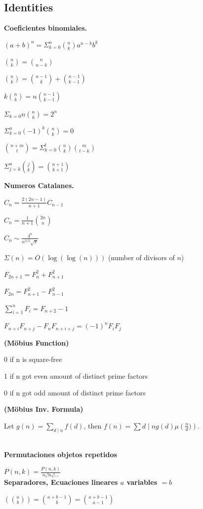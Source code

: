 \subsection{Identities}
{

\textbf{Coeficientes binomiales.}

$(a+b)^{n} = \Sigma_{k = 0}^{n} \binom{n}{k}a^{n-k}b^{k}$

$\binom{n}{k} = \binom{n}{n-k}$

$\binom{n}{k} = \binom{n-1}{k} + \binom{n-1}{k-1}$

$k\binom{n}{k} = n\binom{n-1}{k-1}$

$\Sigma_{k = 0}{n}\binom{n}{k} = 2^{n}$

$\Sigma_{k = 0}^{n} (-1)^{k}\binom{n}{k} = 0$

$\binom{n+m}{t} = \Sigma_{k = 0}^{t}\binom{n}{k}\binom{m}{t-k}$

$\Sigma_{j = k}^{n} \binom{j}{k} = \binom{n+1}{k+1}$

\textbf{Numeros Catalanes.}

$C_n = \frac{2(2n-1)}{n+1} C_{n-1}$

$C_n = \frac{1}{n+1} \binom{2n}{n}$

$C_n \sim \frac{4^n}{n^{3/2}\sqrt{\pi}}$

$\Sigma(n) = O(\log(\log(n)))$ (number of divisors of $n$)

$F_{2n+1} = F_{n}^2 + F_{n+1}^2$

$F_{2n} = F_{n+1}^2 - F_{n-1}^2$

$\sum_{i=1}^n F_i = F_{n+2}-1$

$F_{n+i}F_{n+j} - F_nF_{n+i+j} = (-1)^n F_iF_j$

\textbf{(Möbius Function)}

0 if n is square-free

1 if n got even amount of distinct prime factors

0 if n got odd amount of distinct prime factors

\textbf{(Möbius Inv. Formula)}

Let $g(n) = \sum_{d\mid n} f(d)$, then $f(n)=\sum{d\mid n} g(d) \mu\left(\frac{n}{d})\right)$.
}
\\
\textbf{Permutaciones objetos repetidos}

$P(n,k) = \frac{P(n,k)}{n_{1}!n_{2}!...}$ 
\\
\textbf{Separadores, Ecuaciones lineares $a$ variables $= b$}
  
$\left(\binom{a}{b}\right) = \binom{a+b-1}{b} = \binom{a+b-1}{a-1}$

